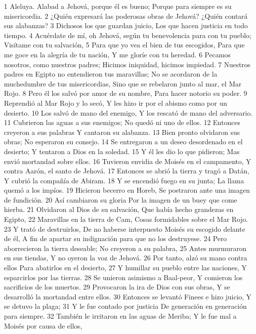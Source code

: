 1 Aleluya.
Alabad a Jehová, porque él es bueno;
Porque para siempre es su misericordia.
2 ¿Quién expresará las poderosas obras de Jehová?
¿Quién contará sus alabanzas?
3 Dichosos los que guardan juicio,
Los que hacen justicia en todo tiempo.
4 Acuérdate de mí, oh Jehová, según tu benevolencia para con tu pueblo;
Visítame con tu salvación,
5 Para que yo vea el bien de tus escogidos,
Para que me goce en la alegría de tu nación,
Y me gloríe con tu heredad.
6 Pecamos nosotros, como nuestros padres;
Hicimos iniquidad, hicimos impiedad.
7 Nuestros padres en Egipto no entendieron tus maravillas;
No se acordaron de la muchedumbre de tus misericordias,
Sino que se rebelaron junto al mar, el Mar Rojo.
8 Pero él los salvó por amor de su nombre,
Para hacer notorio su poder.
9 Reprendió al Mar Rojo y lo secó,
Y les hizo ir por el abismo como por un desierto.
10 Los salvó de mano del enemigo,
Y los rescató de mano del adversario.
11 Cubrieron las aguas a sus enemigos;
No quedó ni uno de ellos.
12 Entonces creyeron a sus palabras
Y cantaron su alabanza.
13 Bien pronto olvidaron sus obras;
No esperaron su consejo.
14 Se entregaron a un deseo desordenado en el desierto;
Y tentaron a Dios en la soledad.
15 Y él les dio lo que pidieron;
Mas envió mortandad sobre ellos.
16 Tuvieron envidia de Moisés en el campamento,
Y contra Aarón, el santo de Jehová.
17 Entonces se abrió la tierra y tragó a Datán,
Y cubrió la compañía de Abiram.
18 Y se encendió fuego en su junta;
La llama quemó a los impíos.
19 Hicieron becerro en Horeb,
Se postraron ante una imagen de fundición.
20 Así cambiaron su gloria
Por la imagen de un buey que come hierba.
21 Olvidaron al Dios de su salvación,
Que había hecho grandezas en Egipto,
22 Maravillas en la tierra de Cam,
Cosas formidables sobre el Mar Rojo.
23 Y trató de destruirlos,
De no haberse interpuesto Moisés su escogido delante de él,
A fin de apartar su indignación para que no los destruyese.
24 Pero aborrecieron la tierra deseable;
No creyeron a su palabra,
25 Antes murmuraron en sus tiendas,
Y no oyeron la voz de Jehová.
26 Por tanto, alzó su mano contra ellos
Para abatirlos en el desierto,
27 Y humillar su pueblo entre las naciones,
Y esparcirlos por las tierras.
28 Se unieron asimismo a Baal-peor,
Y comieron los sacrificios de los muertos.
29 Provocaron la ira de Dios con sus obras,
Y se desarrolló la mortandad entre ellos.
30 Entonces se levantó Finees e hizo juicio,
Y se detuvo la plaga;
31 Y le fue contado por justicia
De generación en generación para siempre.
32 También le irritaron en las aguas de Meriba;
Y le fue mal a Moisés por causa de ellos,
